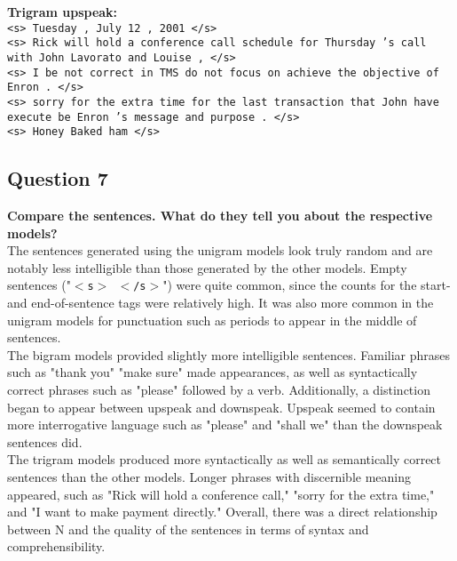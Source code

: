 \documentclass{article} %
\begin{document}
\textbf{Trigram upspeak:}\\

\texttt{<s> Tuesday , July 12 , 2001 </s>\\
<s> Rick will hold a conference call schedule for Thursday 's call with John Lavorato and Louise , </s>\\
<s> I be not correct in TMS do not focus on achieve the objective of Enron . </s>\\
<s> sorry for the extra time for the last transaction that John have execute be Enron 's message and purpose . </s>\\
<s> Honey Baked ham </s>}


\lipsum[2] %

\subsection*{Question 7}

\textbf{Compare the sentences. What do they tell you about the respective models?}
\\

The sentences generated using the unigram models look truly random and are notably less intelligible than those generated by the other models. Empty sentences ("\texttt{$<$s$>$ $<$/s$>$}") were quite common, since the counts for the start- and end-of-sentence tags were relatively high. It was also more common in the unigram models for punctuation such as periods to appear in the middle of sentences.\\

The bigram models provided slightly more intelligible sentences. Familiar phrases such as "thank you" "make sure" made appearances, as well as syntactically correct phrases such as "please" followed by a verb. Additionally, a distinction began to appear between upspeak and downspeak. Upspeak seemed to contain more interrogative language such as "please" and "shall we" than the downspeak sentences did.\\

The trigram models produced more syntactically as well as semantically correct sentences than the other models. Longer phrases with discernible meaning appeared, such as "Rick will hold a conference call," "sorry for the extra time," and "I want to make payment directly." Overall, there was a direct relationship between N and the quality of the sentences in terms of syntax and comprehensibility.
\end{document}
